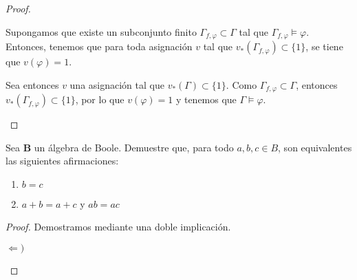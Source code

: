 \documentclass[12pt]{article}
\begin{document}
\begin{ejercicio}
\begin{proof}
\begin{description}
            Supongamos que existe un subconjunto finito $\Gamma_{f, \varphi}\subset \Gamma$ tal que $\Gamma_{f, \varphi} \models \varphi$.
            Entonces, tenemos que para toda asignación $v$ tal que $v_{\ast}(\Gamma_{f, \varphi}) \subset \{1\}$, se tiene que $v(\varphi) = 1$.

            Sea entonces $v$ una asignación tal que $v_{\ast}(\Gamma) \subset \{1\}$. Como $\Gamma_{f, \varphi}\subset \Gamma$, entonces
            $v_{\ast}(\Gamma_{f, \varphi}) \subset \{1\}$, por lo que $v(\varphi) = 1$ y tenemos que $\Gamma \models \varphi$.
        \end{description}
    \end{proof}
\end{ejercicio}

\begin{ejercicio}
    Sea $\mathbf{B}$ un álgebra de Boole. Demuestre que, para todo $a, b, c \in B$, son
    equivalentes las siguientes afirmaciones:
    \begin{enumerate}
        \item $b=c$
        \item $a+b = a+c$ y $ab=ac$
    \end{enumerate}

    \begin{proof}
        Demostramos mediante una doble implicación.
        \begin{description}
            \item[$\Longleftarrow)$]
            

\end{description}
\end{proof}
\end{ejercicio}
\end{document}

